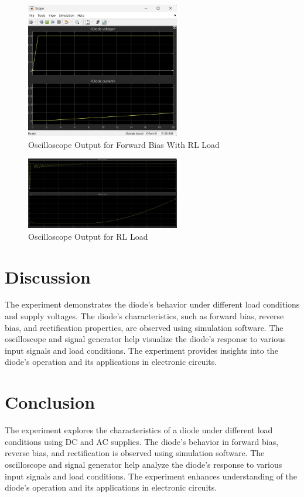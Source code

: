 \documentclass[12pt]{article}
\begin{document}
\begin{figure}[H]
    \centering
    \includegraphics[width=0.6\textwidth]{RLwave.jpg}
    \caption{Oscilloscope Output for Forward Bias With RL Load}
    \label{fig:scope_forward_bias}
\end{figure}

\begin{figure}[H]
    \centering
    \includegraphics[width=0.6\textwidth]{RLwave2.jpg}
    \caption{Oscilloscope Output for RL Load}
    \label{fig:scope_reverse_bias}
\end{figure}


\section*{Discussion}
The experiment demonstrates the diode's behavior under different load conditions and supply voltages. The diode's characteristics, such as forward bias, reverse bias, and rectification properties, are observed using simulation software. The oscilloscope and signal generator help visualize the diode's response to various input signals and load conditions. The experiment provides insights into the diode's operation and its applications in electronic circuits.

\section*{Conclusion}
The experiment explores the characteristics of a diode under different load conditions using DC and AC supplies. The diode's behavior in forward bias, reverse bias, and rectification is observed using simulation software. The oscilloscope and signal generator help analyze the diode's response to various input signals and load conditions. The experiment enhances understanding of the diode's operation and its applications in electronic circuits.


\renewcommand{\bibname}{References}

\end{document}
